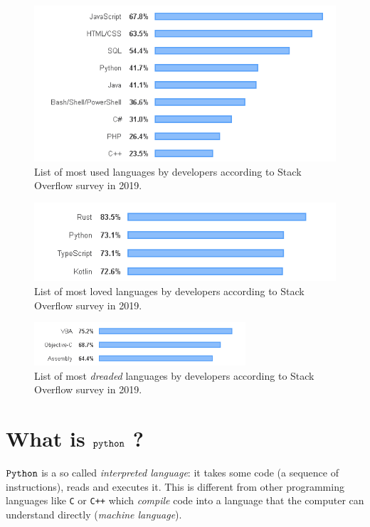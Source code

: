 \begin{center}
  \begin{figure}
    \includegraphics[width=0.7\linewidth]{most_used}
    \caption{List of most used languages by developers according to Stack Overflow survey in 2019.}
  \end{figure}
  \begin{figure}
    \includegraphics[width=0.7\linewidth]{most_loved}
    \caption{List of most loved languages by developers according to Stack Overflow survey in 2019.}
  \end{figure}
  \begin{figure}
    \includegraphics[width=0.7\textwidth]{most_dreaded}
    \caption{List of most \emph{dreaded} languages by developers according to Stack Overflow survey in 2019.}
  \end{figure}
\end{center}

\section{What is $\tt{python}$ ?}\label{what-is-python}

$\tt{Python}$ is a so called \emph{interpreted language}: it takes some code (a sequence of instructions), reads and executes it. This is different from other programming languages like \texttt{C} or \texttt{C++} which \emph{compile} code into a language that the computer can understand directly (\emph{machine language}).

